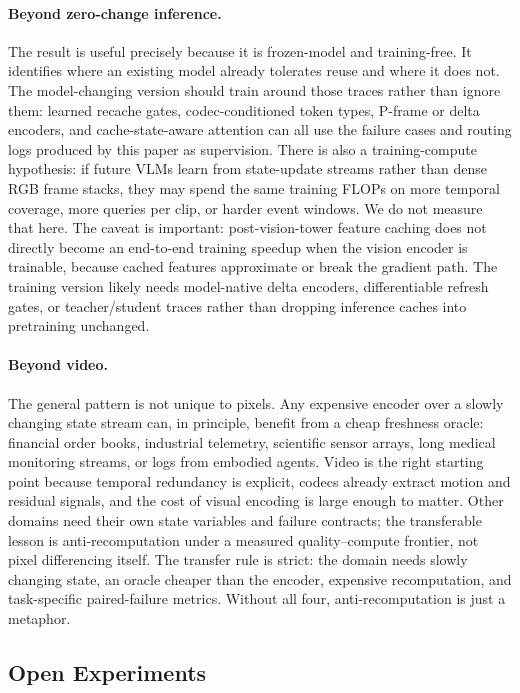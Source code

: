 \paragraph{Beyond zero-change inference.}
The result is useful precisely because it is frozen-model and
training-free. It identifies where an existing model already tolerates reuse
and where it does not. The model-changing version should train around those
traces rather than ignore them: learned recache gates, codec-conditioned token
types, P-frame or delta encoders, and cache-state-aware attention can all use
the failure cases and routing logs produced by this paper as supervision.
There is also a training-compute hypothesis: if future VLMs learn from
state-update streams rather than dense RGB frame stacks, they may spend the
same training FLOPs on more temporal coverage, more queries per clip, or harder
event windows. We do not measure that here. The caveat is important:
post-vision-tower feature caching does not directly become an end-to-end training
speedup when the vision encoder is trainable, because cached features
approximate or break the gradient path. The training version likely needs
model-native delta encoders, differentiable refresh gates, or teacher/student
traces rather than dropping inference caches into pretraining unchanged.

\paragraph{Beyond video.}
The general pattern is not unique to pixels. Any expensive encoder over a
slowly changing state stream can, in principle, benefit from a cheap freshness
oracle: financial order books, industrial telemetry, scientific sensor arrays,
long medical monitoring streams, or logs from embodied agents. Video is the
right starting point because temporal redundancy is explicit, codecs already
extract motion and residual signals, and the cost of visual encoding is large
enough to matter. Other domains need their own state variables and failure
contracts; the transferable lesson is anti-recomputation under a measured
quality--compute frontier, not pixel differencing itself. The transfer rule is
strict: the domain needs slowly changing state, an oracle cheaper than the
encoder, expensive recomputation, and task-specific paired-failure metrics.
Without all four, anti-recomputation is just a metaphor.

\subsection{Open Experiments}

